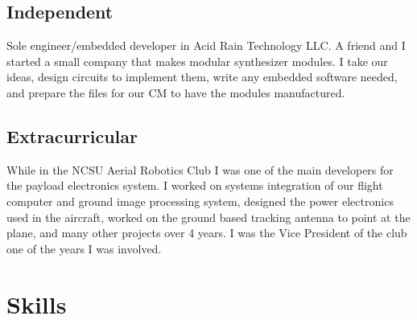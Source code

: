 \documentclass[11pt,a4paper,sans]{moderncv}        %
\begin{document}
\subsection{Independent}
{Sole engineer/embedded developer in Acid Rain Technology LLC. A friend and
I started a small company that makes modular synthesizer modules. I take our
ideas, design circuits to implement them, write any embedded software needed,
and prepare the files for our CM to have the modules manufactured.}

\subsection{Extracurricular}
{While in the NCSU Aerial Robotics Club I was one of the main developers for the
payload electronics system. I worked on systems integration of our flight
computer and ground image processing system, designed the power electronics used
in the aircraft, worked on the ground based tracking antenna to point at the
plane, and many other projects over 4 years. I was the Vice President of the
club one of the years I was involved.}

\section{Skills}
\begin{center}
\end{center}
\end{document}
